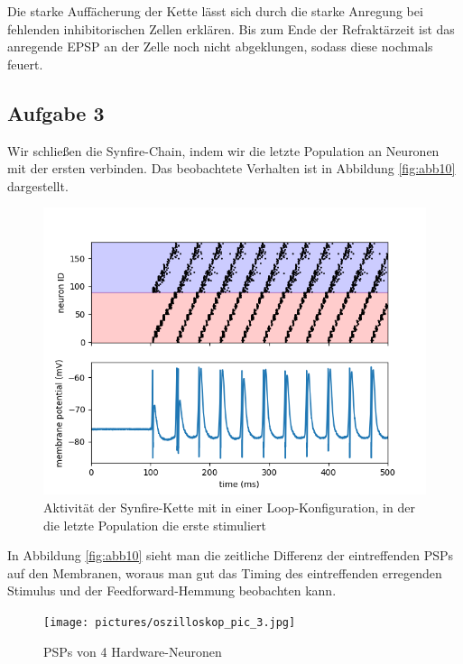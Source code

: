 \documentclass[10pt,a4paper]{scrartcl}
\begin{document}
\noindent Die starke Auffächerung der Kette lässt sich durch die starke Anregung bei fehlenden inhibitorischen Zellen erklären. Bis zum Ende der Refraktärzeit ist das anregende EPSP an der Zelle noch nicht abgeklungen, sodass diese nochmals feuert. 

\subsection{Aufgabe 3}
Wir schließen die Synfire-Chain, indem wir die letzte Population an Neuronen mit der ersten verbinden. Das beobachtete Verhalten ist in Abbildung \ref{fig:abb10} dargestellt.

\newpage

\begin{figure} [ht]
\begin{center}
\label{fig:abb4}
\caption{Aktivität der Synfire-Kette mit in einer Loop-Konfiguration, in der die letzte Population die erste stimuliert}
\includegraphics[scale=0.35]{pictures/synfire_chain_loop.png}
\end{center}
\end{figure}

\noindent In Abbildung \ref{fig:abb10} sieht man die zeitliche Differenz der eintreffenden PSPs auf den Membranen, woraus man gut das Timing des eintreffenden erregenden Stimulus und der Feedforward-Hemmung beobachten kann.

\begin{figure} [ht]
\begin{center}
\label{fig:abb4}
\caption{PSPs von 4 Hardware-Neuronen}
\texttt{[image: pictures/oszilloskop\_pic\_3.jpg]}
\end{center}
\end{figure}
\end{document}
